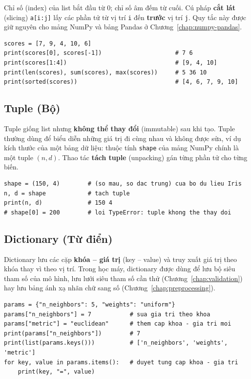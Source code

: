 Chỉ số (index) của list bắt đầu từ 0; chỉ số âm đếm từ cuối. Cú pháp \textbf{cắt lát} (slicing) \texttt{a[i:j]} lấy các phần tử từ vị trí \texttt{i} đến \textbf{trước} vị trí \texttt{j}. Quy tắc này được giữ nguyên cho mảng NumPy và bảng Pandas ở Chương~\ref{chap:numpy-pandas}.

\begin{lstlisting}[caption={Chỉ số, cắt lát và các hàm dựng sẵn trên List}]
scores = [7, 9, 4, 10, 6]
print(scores[0], scores[-1])                     # 7 6
print(scores[1:4])                               # [9, 4, 10]
print(len(scores), sum(scores), max(scores))     # 5 36 10
print(sorted(scores))                            # [4, 6, 7, 9, 10]
\end{lstlisting}

\subsection{Tuple (Bộ)}
Tuple giống list nhưng \textbf{không thể thay đổi} (immutable) sau khi tạo. Tuple thường dùng để biểu diễn những giá trị đi cùng nhau và không được sửa, ví dụ kích thước của một bảng dữ liệu: thuộc tính \texttt{shape} của mảng NumPy chính là một tuple $(n, d)$. Thao tác \textbf{tách tuple} (unpacking) gán từng phần tử cho từng biến.

\begin{lstlisting}[caption={Tuple và phép tách tuple}]
shape = (150, 4)        # (so mau, so dac trung) cua bo du lieu Iris
n, d = shape            # tach tuple
print(n, d)             # 150 4
# shape[0] = 200        # loi TypeError: tuple khong the thay doi
\end{lstlisting}

\subsection{Dictionary (Từ điển)}
Dictionary lưu các cặp \textbf{khóa -- giá trị} (key -- value) và truy xuất giá trị theo khóa thay vì theo vị trí. Trong học máy, dictionary được dùng để lưu bộ siêu tham số của mô hình, lưu lưới siêu tham số cần thử (Chương~\ref{chap:validation}) hay lưu bảng ánh xạ nhãn chữ sang số (Chương~\ref{chap:preprocessing}).

\begin{lstlisting}[caption={Thao tác trên Dictionary}]
params = {"n_neighbors": 5, "weights": "uniform"}
params["n_neighbors"] = 7           # sua gia tri theo khoa
params["metric"] = "euclidean"      # them cap khoa - gia tri moi
print(params["n_neighbors"])        # 7
print(list(params.keys()))          # ['n_neighbors', 'weights', 'metric']
for key, value in params.items():   # duyet tung cap khoa - gia tri
    print(key, "=", value)
\end{lstlisting}

